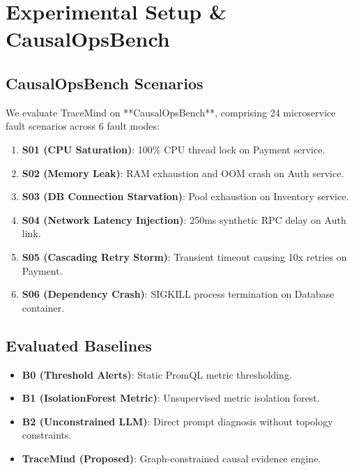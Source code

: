 \section{Experimental Setup & CausalOpsBench}
\label{sec:evaluation}

\subsection{CausalOpsBench Scenarios}
We evaluate TraceMind on **CausalOpsBench**, comprising 24 microservice fault scenarios across 6 fault modes:
\begin{enumerate}
    \item \textbf{S01 (CPU Saturation)}: 100\% CPU thread lock on Payment service.
    \item \textbf{S02 (Memory Leak)}: RAM exhaustion and OOM crash on Auth service.
    \item \textbf{S03 (DB Connection Starvation)}: Pool exhaustion on Inventory service.
    \item \textbf{S04 (Network Latency Injection)}: 250ms synthetic RPC delay on Auth link.
    \item \textbf{S05 (Cascading Retry Storm)}: Transient timeout causing 10x retries on Payment.
    \item \textbf{S06 (Dependency Crash)}: SIGKILL process termination on Database container.
\end{enumerate}

\subsection{Evaluated Baselines}
\begin{itemize}
    \item \textbf{B0 (Threshold Alerts)}: Static PromQL metric thresholding.
    \item \textbf{B1 (IsolationForest Metric)}: Unsupervised metric isolation forest.
    \item \textbf{B2 (Unconstrained LLM)}: Direct prompt diagnosis without topology constraints.
    \item \textbf{TraceMind (Proposed)}: Graph-constrained causal evidence engine.
\end{itemize}
